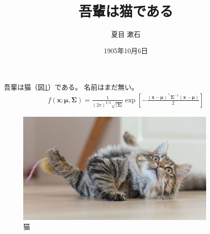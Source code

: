 \documentclass[a4paper,12pt]{jsarticle}
\title{吾輩は猫である}
\author{夏目 漱石}
\date{1905年10月6日}
\begin{document}
\maketitle

吾輩は猫（図\ref{fig:cat}）である\cite{natsume1905wagahai}。
名前はまだ無い。
\begin{align}
  f(\bm{x}; \bm{\mu}, \mathbf{\Sigma})
  =
  \frac{1}{{(2 \pi)}^{k / 2} \sqrt{|\mathbf{\Sigma}|}}
  \exp \left[ -\frac{(\bm{x} - \bm{\mu})^\top \mathbf{\Sigma}^{-1} (\bm{x} - \bm{\mu})}{2} \right]
\end{align}

\begin{figure}[H]
  \centering
  \includegraphics[width=10.0cm]{figs/cat.jpg}
  \caption{猫\protect\footnotemark[1]}
  \label{fig:cat}
\end{figure}




\end{document}
